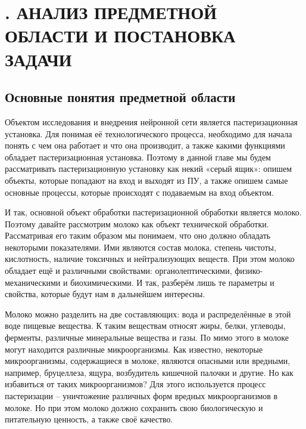 \sectionbreak \section*{
  \cyrillicfont 
  \fontsize{14pt}{0pt}\selectfont
  \englishfont 
  . АНАЛИЗ ПРЕДМЕТНОЙ ОБЛАСТИ И ПОСТАНОВКА ЗАДАЧИ
}

\titlespace
\subsection*{ 
  \cyrillicfont 
  \fontsize{14pt}{0pt}\selectfont
  \englishfont
   Основные понятия предметной области
} 
\titlespace

{\cyrillicfont 
\fontsize{13pt}{16.25pt}\selectfont 
\englishfont 

  \par \redline Объектом исследования и внедрения нейронной сети является пастеризационная установка. Для понимая её технологического процесса, необходимо для начала понять с чем она работает и что она производит, а также какими функциями обладает пастеризационная установка. Поэтому в данной главе мы будем рассматривать пастеризационную установку как некий «серый ящик»: опишем объекты, которые попадают на вход и выходят из ПУ, а также опишем самые основные процессы, которые происходят с подаваемым на вход объектом. 

  \par \redline И так, основной объект обработки пастеризационной обработки является молоко. Поэтому давайте рассмотрим молоко как объект технической обработки. Рассматривая его таким образом мы понимаем, что оно должно обладать некоторыми показателями. Ими являются состав молока, степень чистоты, кислотность, наличие токсичных и нейтрализующих веществ. При этом молоко обладает ещё и различными свойствами: органолептическими, физико-механическими и биохимическими. И так, разберём лишь те параметры и свойства, которые будут нам в дальнейшем интересны.

  \par \redline Молоко можно разделить на две составляющих: вода и распределённые в этой воде пищевые вещества. К таким веществам относят жиры, белки, углеводы, ферменты, различные минеральные вещества и газы. По мимо этого в молоке могут находится различные микроорганизмы. Как известно, некоторые микроорганизмы, содержащиеся в молоке, являются опасными или вредными, например, бруцеллеза, ящура, возбудитель кишечной палочки и другие. Но как избавиться от таких микроорганизмов?  Для этого используется процесс пастеризации {--} уничтожение различных форм вредных микроорганизмов в молоке. Но при этом молоко должно сохранить свою биологическую и питательную ценность, а также своё качество. 

}
